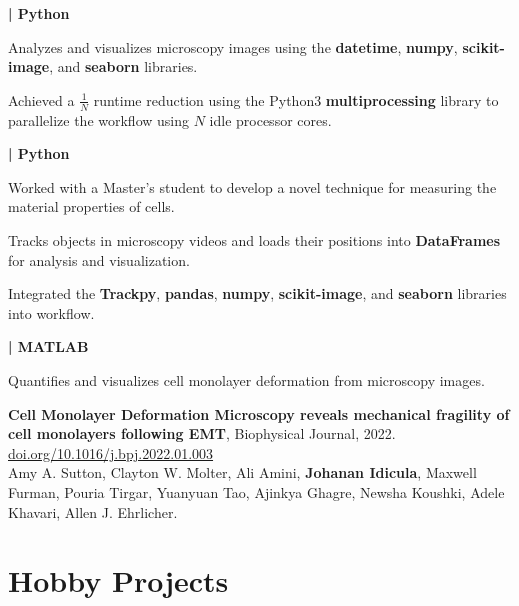 \documentclass[]{jidicula-resume}
\begin{document}
\textbf{| Python}
\begin{tightemize}
\item Analyzes and visualizes microscopy images using the \textbf{datetime},
  \textbf{numpy}, \textbf{scikit-image}, and \textbf{seaborn} libraries.
\item Achieved a $\frac{1}{N}$ runtime reduction using the Python3 \textbf{multiprocessing} library to parallelize the workflow using $N$ idle processor cores.
\end{tightemize}
\sectionsep{}
\textbf{| Python}
\begin{tightemize}
  
\item Worked with a Master's student to develop a novel technique for measuring the material properties of cells.

\item Tracks objects in microscopy videos and loads their
  positions into \textbf{DataFrames} for analysis and visualization.
\item Integrated the \textbf{Trackpy}, \textbf{pandas}, \textbf{numpy},
  \textbf{scikit-image}, and \textbf{seaborn} libraries into workflow.
\end{tightemize}
\sectionsep{}
\textbf{| MATLAB}
\begin{tightemize}
\item Quantifies and visualizes cell monolayer deformation from microscopy
  images.
\item \textbf{Cell Monolayer Deformation Microscopy reveals mechanical fragility of cell monolayers following EMT}, Biophysical Journal, 2022. \href{https://doi.org/10.1016/j.bpj.2022.01.003}{doi.org/10.1016/j.bpj.2022.01.003}\\
  Amy A. Sutton, Clayton W. Molter, Ali Amini, \textbf{Johanan Idicula},
  Maxwell Furman, Pouria Tirgar, Yuanyuan Tao, Ajinkya Ghagre, Newsha Koushki, Adele Khavari, Allen J. Ehrlicher.

\end{tightemize}
\sectionsep{}

\section{Hobby Projects}
\end{document}
